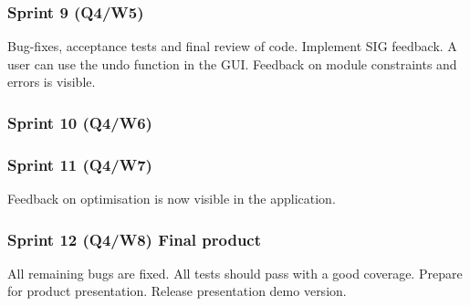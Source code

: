 \documentclass[10pt,a4paper]{report}
\begin{document}
			\subsubsection*{Sprint 9 (Q4/W5)}
				Bug-fixes, acceptance tests and final review of code. Implement SIG feedback. A user can use the undo function in the GUI. Feedback on module constraints and errors is visible.
			\subsubsection*{Sprint 10 (Q4/W6)}
				
			\subsubsection*{Sprint 11 (Q4/W7)}
				Feedback on optimisation is now visible in the application. 
			\subsubsection*{Sprint 12 (Q4/W8) Final product}
				All remaining bugs are fixed. All tests should pass with a good coverage. Prepare for product presentation. Release presentation demo version.

	\clearpage
\end{document}
